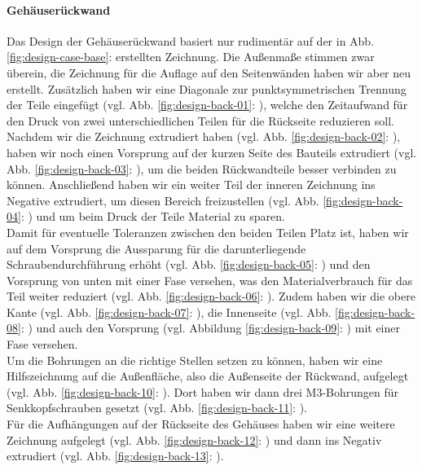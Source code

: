 \paragraph{Gehäuserückwand}\par
Das Design der Gehäuserückwand basiert nur rudimentär auf der in Abb. \ref{fig:design-case-base}:  erstellten Zeichnung. 
Die Außenmaße stimmen zwar überein, die Zeichnung für die Auflage auf den Seitenwänden haben wir aber neu erstellt. 
Zusätzlich haben wir eine Diagonale zur punktsymmetrischen Trennung der Teile eingefügt (vgl. Abb. \ref{fig:design-back-01}: ), welche den Zeitaufwand für den Druck von zwei unterschiedlichen Teilen für die Rückseite reduzieren soll. \\
\noindent Nachdem wir die  Zeichnung extrudiert haben (vgl. Abb. \ref{fig:design-back-02}: ), haben wir noch einen Vorsprung auf der kurzen Seite des Bauteils extrudiert (vgl. Abb. \ref{fig:design-back-03}: ), um die beiden Rückwandteile besser verbinden zu können. 
Anschließend haben wir ein weiter Teil der inneren Zeichnung ins Negative extrudiert, um diesen Bereich freizustellen (vgl. Abb. \ref{fig:design-back-04}: ) und um beim Druck der Teile Material zu sparen. \\
\noindent Damit für eventuelle Toleranzen zwischen den beiden Teilen Platz ist, haben wir auf dem Vorsprung die Aussparung für die darunterliegende Schraubendurchführung erhöht (vgl. Abb. \ref{fig:design-back-05}: ) und den Vorsprung von unten mit einer Fase versehen, was den Materialverbrauch für das Teil weiter reduziert (vgl. Abb. \ref{fig:design-back-06}: ). 
Zudem haben wir die obere Kante (vgl. Abb. \ref{fig:design-back-07}: ), die Innenseite (vgl. Abb. \ref{fig:design-back-08}: ) und auch den Vorsprung (vgl. Abbildung \ref{fig:design-back-09}: ) mit einer Fase versehen. \\
\noindent Um die Bohrungen an die richtige Stellen setzen zu können, haben wir eine Hilfszeichnung auf die Außenfläche, also die Außenseite der Rückwand, aufgelegt (vgl. Abb. \ref{fig:design-back-10}: ). 
Dort haben wir dann drei M3-Bohrungen für Senkkopfschrauben gesetzt (vgl. Abb. \ref{fig:design-back-11}: ). \\
\noindent Für die Aufhängungen auf der Rückseite des Gehäuses haben wir eine weitere Zeichnung aufgelegt (vgl. Abb. \ref{fig:design-back-12}: ) und dann ins Negativ extrudiert (vgl. Abb. \ref{fig:design-back-13}: ).
